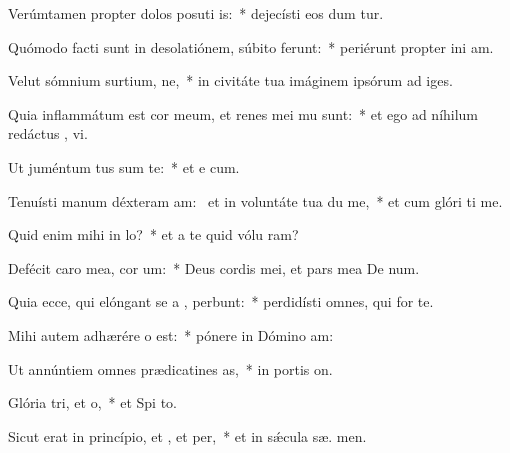 \item Verúmtamen propter dolos posuti is:~* dejecísti eos dum tur.
\item Quómodo facti sunt in desolatiónem, súbito ferunt:~* periérunt propter ini am.
\item Velut sómnium surtium, ne,~* in civitáte tua imáginem ipsórum ad  iges.
\item Quia inflammátum est cor meum, et renes mei mu sunt:~* et ego ad níhilum redáctus ,  vi.
\item Ut juméntum tus sum  te:~* et e  cum.
\item Tenuísti manum déxteram am:~\pscross{} et in voluntáte tua du me,~* et cum glóri ti me.
\item Quid enim mihi  in lo?~* et a te quid vólu  ram?
\item Defécit caro mea,  cor um:~* Deus cordis mei, et pars mea De  num.
\item Quia ecce, qui elóngant se a , perbunt:~* perdidísti omnes, qui for  te.
\item Mihi autem adhærére o  est:~* pónere in Dómino   am:
\item Ut annúntiem omnes prædicatines as,~* in portis  on.
\item Glória tri, et o,~* et Spi to.
\item Sicut erat in princípio, et , et per,~* et in sǽcula sæ. men.
